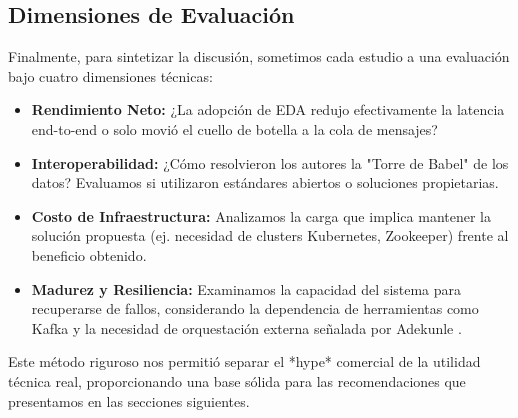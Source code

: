 \subsection{Dimensiones de Evaluación}
Finalmente, para sintetizar la discusión, sometimos cada estudio a una evaluación bajo cuatro dimensiones técnicas:
\begin{itemize}
    \item \textbf{Rendimiento Neto:} ¿La adopción de EDA redujo efectivamente la latencia end-to-end o solo movió el cuello de botella a la cola de mensajes?
    \item \textbf{Interoperabilidad:} ¿Cómo resolvieron los autores la "Torre de Babel" de los datos? Evaluamos si utilizaron estándares abiertos o soluciones propietarias.
    \item \textbf{Costo de Infraestructura:} Analizamos la carga que implica mantener la solución propuesta (ej. necesidad de clusters Kubernetes, Zookeeper) frente al beneficio obtenido.
    \item \textbf{Madurez y Resiliencia:} Examinamos la capacidad del sistema para recuperarse de fallos, considerando la dependencia de herramientas como Kafka y la necesidad de orquestación externa señalada por Adekunle \cite{adekunle2024financial}.
\end{itemize}

Este método riguroso nos permitió separar el *hype* comercial de la utilidad técnica real, proporcionando una base sólida para las recomendaciones que presentamos en las secciones siguientes.